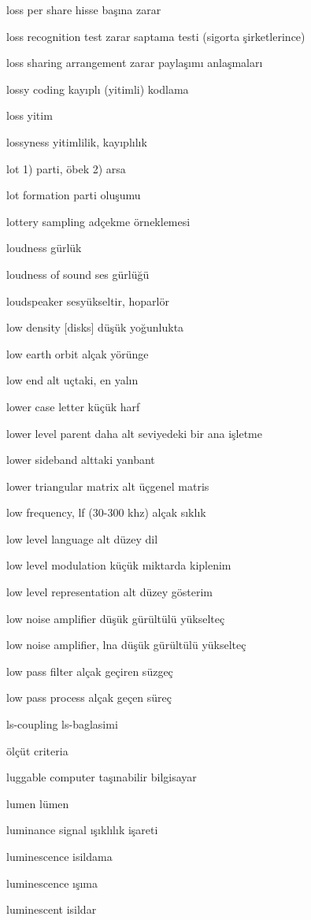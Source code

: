\documentclass[12pt,fleqn]{article}\usepackage{../../common}
\begin{document}
loss per share hisse başına zarar

loss recognition test zarar saptama testi (sigorta şirketlerince)

loss sharing arrangement zarar paylaşımı anlaşmaları

lossy coding kayıplı (yitimli) kodlama

loss yitim

lossyness yitimlilik, kayıplılık

lot 1) parti, öbek 2) arsa

lot formation parti oluşumu

lottery sampling adçekme örneklemesi

loudness gürlük

loudness of sound ses gürlüğü

loudspeaker sesyükseltir, hoparlör

low density [disks] düşük yoğunlukta

low earth orbit alçak yörünge

low end alt uçtaki, en yalın

lower case letter küçük harf

lower level parent daha alt seviyedeki bir ana işletme

lower sideband alttaki yanbant

lower triangular matrix alt üçgenel matris

low frequency, lf (30-300 khz) alçak sıklık

low level language alt düzey dil

low level modulation küçük miktarda kiplenim

low level representation alt düzey gösterim

low noise amplifier düşük gürültülü yükselteç

low noise amplifier, lna düşük gürültülü yükselteç

low pass filter alçak geçiren süzgeç

low pass process alçak geçen süreç

ls-coupling ls-baglasimi

ölçüt criteria

luggable computer taşınabilir bilgisayar

lumen lümen

luminance signal ışıklılık işareti

luminescence isildama

luminescence ışıma

luminescent isildar
\end{document}
